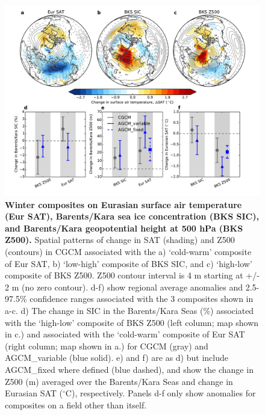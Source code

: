 \documentclass{nature}
\begin{document}
\begin{figure}%
\centering
\noindent\includegraphics[width=39pc]{Word/Figure_5.pdf}
\caption{\textbf{Winter composites on Eurasian surface air temperature (Eur SAT), Barents/Kara sea ice concentration (BKS SIC), and Barents/Kara geopotential height at 500 hPa (BKS Z500).} Spatial patterns of change in SAT (shading) and Z500 (contours) in CGCM associated with the a) `cold-warm' composite of Eur SAT, b) `low-high' composite of BKS SIC, and c) `high-low' composite of BKS Z500. Z500 contour interval is 4 m starting at +/- 2 m (no zero contour). d-f) show regional average anomalies and 2.5-97.5\% confidence ranges associated with the 3 composites shown in a-c. d) The change in SIC in the Barents/Kara Seas (\%) associated with the `high-low' composite of BKS Z500 (left column; map shown in c.) and associated with the `cold-warm' composite of Eur SAT (right column; map shown in a.) for CGCM (gray) and AGCM\_variable (blue solid). e) and f) are as d) but include AGCM\_fixed where defined (blue dashed), and show the change in Z500 (m) averaged over the Barents/Kara Seas and change in Eurasian SAT ($^\circ$C), respectively. Panels d-f only show anomalies for composites on a field other than itself. 
} %
\label{fig:fig5} 
\end{figure}
\end{document}
